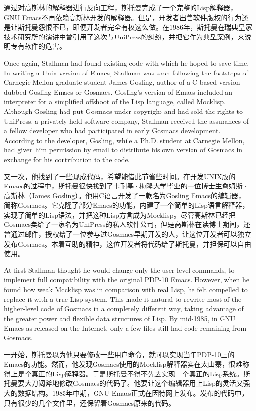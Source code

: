 \ifdefined\chs
通过对高斯林的解释器进行反向工程，斯托曼完成了一个完整的Lisp解释器，GNU Emacs不再依赖高斯林开发的解释器。但是，开发者出售软件版权的行为还是让斯托曼怨恨不已，即便开发者完全有权这么做。在1986年，斯托曼在瑞典皇家技术研究所的演讲中曾引用了这次与UniPress的纠纷，并把它作为典型案例，来说明专有软件的危害。
\fi

\fi
\ifdefined\vtwo
\ifdefined\eng
Once again, Stallman had found existing code with which he hoped to save time. In writing a Unix version of Emacs, Stallman was soon following the footsteps of Carnegie Mellon graduate student James Gosling, author of a C-based version dubbed Gosling Emacs or Gosmacs. Gosling's version of Emacs included an interpreter for a simplified offshoot of the Lisp language, called Mocklisp. Although Gosling had put Gosmacs under copyright and had sold the rights to UniPress, a privately held software company, Stallman received the assurances of a fellow developer who had participated in early Gosmacs development. According to the developer, Gosling, while a Ph.D. student at Carnegie Mellon, had given him permission by email to distribute his own version of Gosmacs in exchange for his contribution to the code.
\fi

\ifdefined\chs
又一次，他找到了一些现成代码，希望能借此节省些时间。在开发UNIX版的Emacs的过程中，斯托曼很快找到了卡耐基·梅隆大学毕业的一位博士生詹姆斯·高斯林（James Gosling）。他用C语言开发了一款名为Gosling Emacs的编辑器，简称Gosmacs。它克隆了部分Emacs的功能，内建了一个简单的Lisp语言解释器，实现了简单的Lisp语法，并把这种Lisp方言成为Mocklisp。尽管高斯林已经把Gosmacs卖给了一家名为UniPress的私人软件公司，但是高斯林在读博士期间，还曾通过邮件，授权给了一位参与过Gosmacs早期开发的人，让这位开发者可以独立发布Gosmacs。本着互助的精神，这位开发者将代码给了斯托曼，并担保可以自由使用。
\fi

\ifdefined\eng
At first Stallman thought he would change only the user-level commands, to implement full compatibility with the original PDP-10 Emacs.  However, when he found how weak Mocklisp was in comparison with real Lisp, he felt compelled to replace it with a true Lisp system.  This made it natural to rewrite most of the higher-level code of Gosmacs in a completely different way, taking advantage of the greater power and flexible data structures of Lisp.  By mid-1985, in GNU Emacs as released on the Internet, only a few files still had code remaining from Gosmacs.
\fi

\ifdefined\chs
一开始，斯托曼以为他只要修改一些用户命令，就可以实现当年PDP-10上的Emacs的功能。然而，他发现Gosmacs使用的Mocklisp解释器实在太山寨，很难称得上是个真正的Lisp解释器。于是斯托曼不得不先去实现一个真正的Lisp系统。斯托曼要大刀阔斧地修改Gosmacs的代码了。他要让这个编辑器用上Lisp的灵活又强大的数据结构。1985年中期，GNU Emacs正式在因特网上发布。发布的代码中，只有很少的几个文件里，还保留着Gosmacs原来的代码。
\fi

